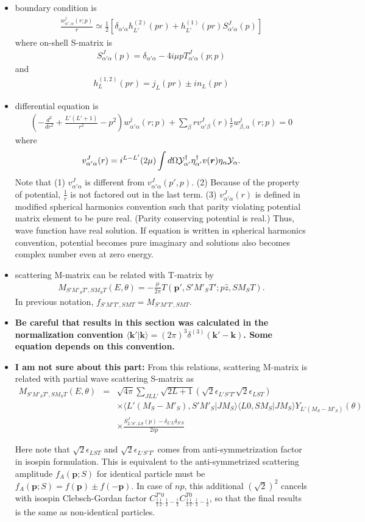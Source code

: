 \documentclass[10pt]{book}
\def\bm{\boldsymbol}
\newcommand{\bea}{\begin{eqnarray}}
\newcommand{\eea}{\end{eqnarray}}
\newcommand{\no}{\nonumber \\}
\def\vp{{\bm p}}
\def\vk{{\bm k}}
\def\vr{{\bm r}}
\def\la{\langle}
\def\ra{\rangle}
\begin{document}
\begin{itemize}
\item boundary condition is
\bea
\frac{w_{\alpha',\alpha}^j(r;p)}{r}
\simeq \frac{1}{2}[\delta_{\alpha'\alpha}h^{(2)}_{L'}(pr)
          +h_{L'}^{(1)}(pr) S^J_{\alpha'\alpha}(p)]
\eea
where on-shell S-matrix is
\bea
S^J_{\alpha'\alpha}(p)
=\delta_{\alpha'\alpha}-4i\mu p T^J_{\alpha'\alpha}(p;p)
\eea
and 
\bea
h_L^{(1,2)}(pr)=j_{L}(pr)\pm i n_L(pr)
\eea
\item differential equation is
\bea
\left(-\frac{d^2}{dr^2}+\frac{L'(L'+1)}{r^2}-p^2\right)w^j_{\alpha'\alpha}(r;p)+\sum_{\beta} r v^J_{\alpha'\beta}(r)\frac{1}{r} w^j_{\beta,\alpha}(r;p)=0
\eea
where
\bea
v^J_{\alpha'\alpha}(r)=i^{L-L'} (2\mu)
  \int d\Omega {\cal Y}_{\alpha'}^\dagger\eta^\dagger_{\alpha'}
            v(\vr) \eta_\alpha {\cal Y}_{\alpha}.             
\eea
Note that (1) $v^J_{\alpha'\alpha}$ is different from $v^J_{\alpha'\alpha}(p',p)$. (2) Because of the property of potential, $\frac{1}{r}$
is not factored out in the last term. (3) $v^J_{\alpha'\alpha}(r)$
is defined in modified spherical harmonics convention such that
parity violating potential matrix element to be pure real. 
(Parity conserving potential is real.)
Thus,
wave function have real solution. If equation is written in spherical
harmonics convention, potential becomes pure imaginary and solutions 
also becomes complex number even at zero energy.

\item scattering M-matrix can be related with T-matrix by
\bea
M_{S' M'_S T',SM_S T}(E,\theta)=-\frac{\mu}{2\pi} T(\vp',S' M'_S T'; p\hat{z},S M_S T).
\eea
In previous notation, $f_{S'M'T',SMT}=M_{S'M'T',SMT}$.

\item {\bf Be careful that results in this section was calculated 
in the normalization convention $\la \vk'|\vk\ra=(2\pi)^3\delta^{(3)}(\vk'-\vk)$. Some equation depends on this convention.}
\item {\bf I am not sure about this part:}  From this relations, scattering M-matrix is related 
with partial wave scattering S-matrix as
\bea
M_{S'M'_ST',SM_ST}(E,\theta)
&=&\sqrt{4\pi}\sum_{JLL'}
  \sqrt{2L+1}
  \left(\sqrt{2}\epsilon_{L'S'T'}\sqrt{2}\epsilon_{LST}\right)
   \no & &\times
 \la L' (M_S-M'_S),S' M'_S|J M_S\ra
 \la L0,S M_S|J M_S\ra
 Y_{L'(M_S-M'_S)}(\theta) \no & &\times
 \frac{S^J_{L'S',LS}(p)-\delta_{L'L}\delta_{S'S}}{2 ip}
\eea



Here note that $\sqrt{2}\epsilon_{LST}$ and
 $\sqrt{2}\epsilon_{L'S'T'}$
comes from anti-symmetrization factor in isospin formulation.
This is equivalent to the 
anti-symmetrized scattering amplitude $f_A(\vp;S)$ 
for identical particle
must be $f_A(\vp;S)=f(\vp)\pm f(-\vp)$. In case of $np$,  this additional $(\sqrt{2})^2$ cancels with isospin Clebsch-Gordan factor 
$C_{\frac{1}{2}\frac{1}{2},\frac{1}{2}-\frac{1}{2}}^{T'0}
 C_{\frac{1}{2}\frac{1}{2},\frac{1}{2}-\frac{1}{2}}^{T0}$,
so that the final results is the same as non-identical particles.




\end{itemize}
\end{document}
